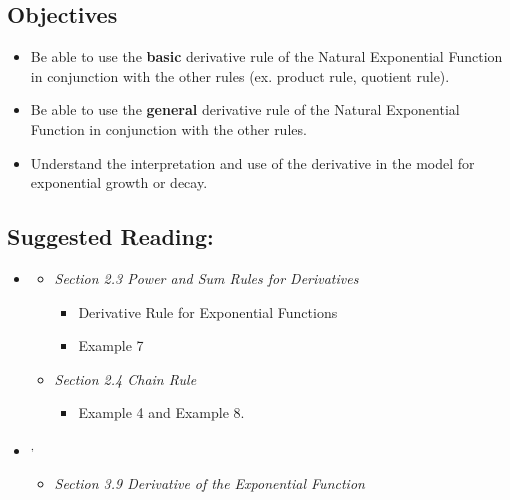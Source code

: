\vspace{-0.25 in}
\begin{framed}
\subsection*{Objectives}
\begin{itemize}
    \item Be able to use the \textbf{basic} derivative rule of the Natural Exponential Function in conjunction with the other rules (ex. product rule, quotient rule).
    \item Be able to use the \textbf{general} derivative rule of the Natural Exponential Function in conjunction with the other rules.
    \item Understand the interpretation and use of the derivative in the model for exponential growth or decay. 
\end{itemize}

\subsection*{Suggested Reading:}
\begin{itemize}
\item \cite{Calaway}\footnotemark[1]
   \begin{itemize}
        \item \emph{Section 2.3 Power and Sum Rules for Derivatives}
        \begin{itemize}
            \item Derivative Rule for Exponential Functions 
            \item Example 7
        \end{itemize}
    \end{itemize}
    \begin{itemize}
        \item \emph{Section 2.4 Chain Rule}
        \begin{itemize}
            \item Example 4 and Example 8.
        \end{itemize}
    \end{itemize}

\item \cite{openstax}\footnotemark[2]\textsuperscript{,}\footnotemark[3]
    \begin{itemize}
        \item \emph{Section 3.9 Derivative of the Exponential Function}
       

\end{itemize}
\end{itemize}
\end{framed}
